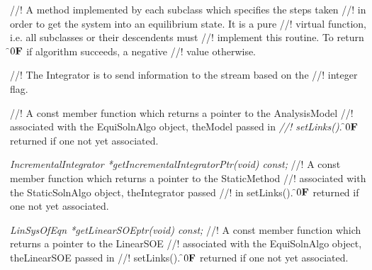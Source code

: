 //! A method implemented by each subclass which specifies the steps taken
//! in order to get the system into an equilibrium state. It is a pure
//! virtual function, i.e. all subclasses or their descendents must
//! implement this routine. To return \f$0{\bf F}$ if algorithm succeeds, a negative
//! value otherwise. 

//! The Integrator is to send information to the stream based on the
//! integer \p flag.

//! A const member function which returns a pointer to the AnalysisModel
//! associated with the EquiSolnAlgo object, \p theModel passed in {\em
//! setLinks()}. \f$0{\bf F}$ returned if one not yet associated.

{\em IncrementalIntegrator *getIncrementalIntegratorPtr(void) const;}
//! A const member function which returns a pointer to the StaticMethod
//! associated with the StaticSolnAlgo object, \p theIntegrator passed
//! in setLinks(). \f$0{\bf F}$ returned if one not yet associated.
 
{\em LinSysOfEqn *getLinearSOEptr(void) const;}
//! A const member function which returns a pointer to the LinearSOE
//! associated with the EquiSolnAlgo object, \p theLinearSOE passed in
//! setLinks(). \f$0{\bf F}$ returned if one not yet associated.





